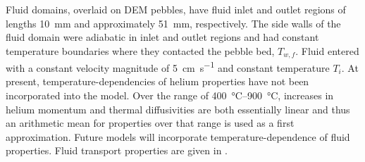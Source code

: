 Fluid domains, overlaid on DEM pebbles, have fluid inlet and outlet regions of lengths \SI{10}{\milli\meter} and approximately \SI{51}{\milli\meter}, respectively. The side walls of the fluid domain were adiabatic in inlet and outlet regions and had constant temperature boundaries where they contacted the pebble bed, $T_{w,f}$. Fluid entered with a constant velocity magnitude of \SI{5}{\centi\meter\per\second} and constant temperature $T_i$. At present, temperature-dependencies of helium properties have not been incorporated into the model. Over the range of \SIrange{400}{900}{\celsius}, increases in helium momentum and thermal diffusivities are both essentially linear and thus an arithmetic mean for properties over that range is used as a first approximation. Future models will incorporate temperature-dependence of fluid properties. Fluid transport properties are given in . 


